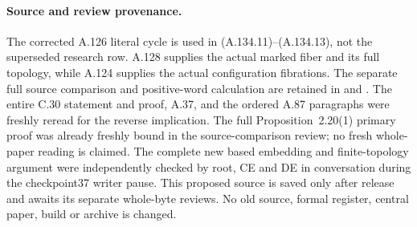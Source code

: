 \paragraph{Source and review provenance.}
The corrected A.126 literal cycle is used in
(A.134.11)--(A.134.13), not the superseded research row.
A.128 supplies the actual marked fiber and its full
topology, while A.124 supplies the actual configuration
fibrations. The separate full source comparison and
positive-word calculation are retained in
and .
The entire C.30 statement and proof, A.37, and the
ordered A.87 paragraphs were freshly reread for the
reverse implication. The full Proposition~2.20(1)
primary proof was already freshly bound in the
source-comparison review; no fresh whole-paper reading
is claimed. The complete new based embedding and
finite-topology argument were independently checked
by root, CE and DE in conversation during the
checkpoint37 writer pause. This proposed source is
saved only after release and awaits its separate
whole-byte reviews. No old source, formal register,
central paper, build or archive is changed.
